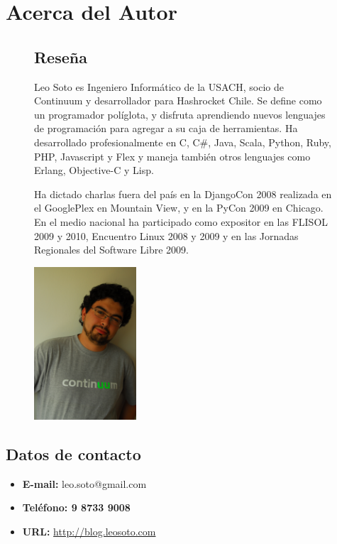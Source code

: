 \section{Acerca del Autor}

\begin{figure}[h]
\begin{minipage}{11.5cm}

\subsection{Reseña}

Leo Soto es Ingeniero Informático de la USACH, socio de Continuum y
desarrollador para Hashrocket Chile. Se define como un programador políglota, y
disfruta aprendiendo nuevos lenguajes de programación para agregar a su caja de
herramientas. Ha desarrollado profesionalmente en C, C\#, Java, Scala, Python,
Ruby, PHP, Javascript y Flex y maneja también otros lenguajes como Erlang,
Objective-C y Lisp.

Ha dictado charlas fuera del país en la DjangoCon 2008 realizada en el
GooglePlex en Mountain View, y en la PyCon 2009 en Chicago. En el medio nacional
ha participado como expositor en las FLISOL 2009 y 2010, Encuentro Linux 2008 y
2009 y en las Jornadas Regionales del Software Libre 2009.

\end{minipage}
\begin{minipage}{1.7in}
\includegraphics[width=1.5in]{images/foto.jpg}
\end{minipage}
\end{figure}

\subsection{Datos de contacto}

\begin{itemize}
\item{\textbf{E-mail:} leo.soto@gmail.com}
\item\textbf{{Teléfono:} 9 8733 9008}
\item{\textbf{URL:} \url{http://blog.leosoto.com}}
\end{itemize}
